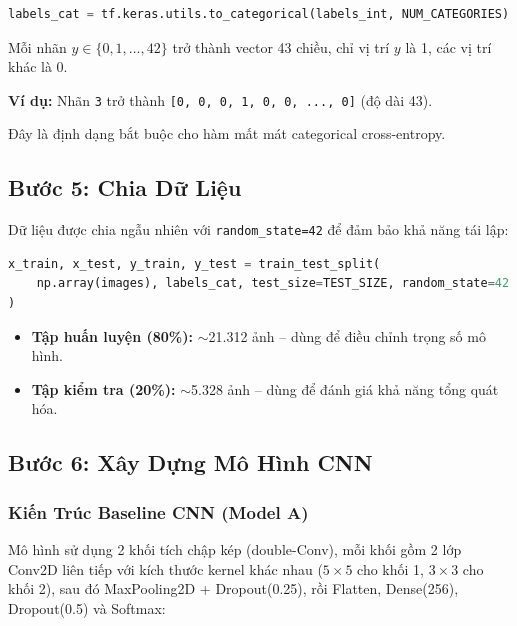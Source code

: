 \documentclass[12pt,a4paper]{article}
\begin{document}
\begin{lstlisting}[language=Python]
labels_cat = tf.keras.utils.to_categorical(labels_int, NUM_CATEGORIES)
\end{lstlisting}

Mỗi nhãn $y \in \{0, 1, \dots, 42\}$ trở thành vector 43 chiều, chỉ vị trí $y$ là 1, các vị trí khác là 0.

\textbf{Ví dụ:} Nhãn \texttt{3} trở thành \texttt{[0, 0, 0, 1, 0, 0, ..., 0]} (độ dài 43).

Đây là định dạng bắt buộc cho hàm mất mát categorical cross-entropy.

\subsection{Bước 5: Chia Dữ Liệu}

Dữ liệu được chia ngẫu nhiên với \texttt{random\_state=42} để đảm bảo khả năng tái lập:

\begin{lstlisting}[language=Python]
x_train, x_test, y_train, y_test = train_test_split(
    np.array(images), labels_cat, test_size=TEST_SIZE, random_state=42
)
\end{lstlisting}

\begin{itemize}
    \item \textbf{Tập huấn luyện (80\%):} $\sim$21.312 ảnh -- dùng để điều chỉnh trọng số mô hình.
    \item \textbf{Tập kiểm tra (20\%):} $\sim$5.328 ảnh -- dùng để đánh giá khả năng tổng quát hóa.
\end{itemize}

\subsection{Bước 6: Xây Dựng Mô Hình CNN}

\subsubsection*{Kiến Trúc Baseline CNN (Model A)}

Mô hình sử dụng 2 khối tích chập kép (double-Conv), mỗi khối gồm 2 lớp Conv2D liên tiếp với kích thước kernel khác nhau ($5\times5$ cho khối 1, $3\times3$ cho khối 2), sau đó MaxPooling2D + Dropout(0.25), rồi Flatten, Dense(256), Dropout(0.5) và Softmax:
\end{document}

